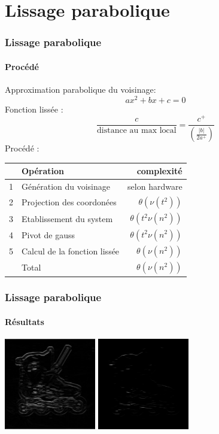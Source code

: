 \documentclass[french]{beamer}
\begin{document}
\section{Lissage parabolique}

\begin{frame}
	\frametitle{Lissage parabolique}
	\framesubtitle{Procédé}
	Approximation parabolique du voisinage: $$ax^2 + bx + c = 0$$
	Fonction lissée : $$\frac{c}{\text{distance au max local}} = \frac{c^+}{\left(\frac{|b|}{2a^+}\right)}$$
	Procédé : \\
	\smallskip
	\begin{tabular}{|c|l|r|}
		\hline
		& Opération & complexité \\ \hline
		1 & Génération du voisinage & selon hardware \\ \hline
		2 & Projection des coordonées & $\theta(\nu(t^2))$ \\ \hline
		3 & Etablissement du system & $\theta(t^2 \nu(n^2))$ \\ \hline
		4 & Pivot de gauss & $\theta(t^2 \nu(n^2))$ \\ \hline
		5 & Calcul de la fonction lissée & $\theta(\nu(n^2))$ \\ \hline
		& Total & $\theta(\nu(n^2))$ \\
		\hline
	\end{tabular}
\end{frame}

\begin{frame}
	\frametitle{Lissage parabolique}
	\framesubtitle{Résultats}
	\includegraphics[width=4cm]{images/roller_filtered.jpg} \; \includegraphics[width=4cm]{images/roller_localised.jpg}
\end{frame}
\end{document}
